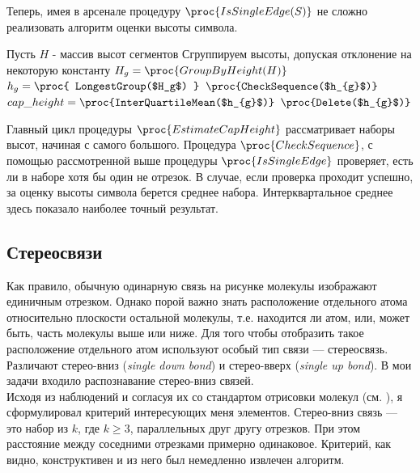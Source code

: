 \noindent
Теперь, имея в арсенале процедуру $\proc{IsSingleEdge(S)}$ не сложно реализовать алгоритм оценки высоты символа.

\begin{codebox}
  \li \Comment Пусть $H$ - массив высот сегментов
  \li
  \li \Comment Сгруппируем высоты, допуская отклонение на некоторую константу
  \li $ H_{g} = \proc{GroupByHeight(H)} $
  \li
  \li \Repeat 
  \li $ h_{g} = \proc{ LongestGroup($H_g$) } $
  \li \If $ \proc{CheckSequence($h_{g}$)} $
  \li \Then $cap\_height = \proc{InterQuartileMean($h_{g}$)} $
  \li \Return \End
  \li $\proc{Delete($h_{g}$)}$
  \li \Until {} \End
\end{codebox}

\noindent
Главный цикл процедуры $\proc{EstimateCapHeight}$ рассматривает наборы высот, начиная с самого большого. Процедура $\proc{CheckSequence}$, с помощью
рассмотренной выше процедуры $\proc{IsSingleEdge}$ проверяет, есть ли в наборе хотя бы один не отрезок. В случае, если проверка проходит успешно,
за оценку высоты символа берется среднее набора. Интерквартальное среднее здесь показало наиболее точный результат. 

\subsection{Стереосвязи}
\label{subsec:stereobonds}

Как правило, обычную одинарную связь на рисунке молекулы изображают единичным отрезком. Однако порой важно знать расположение
отдельного атома относительно плоскости остальной молекулы, т.е. находится ли атом, или, может быть, часть молекулы выше или ниже. 
Для того чтобы отобразить такое расположение отдельного атом используют особый тип связи --- стереосвязь. Различают стерео-вниз 
(\emph{single down bond}) и стерео-вверх (\emph{single up bond}). В мои задачи входило распознавание стерео-вниз связей. \\

\noindent
Исходя из наблюдений и согласуя их со стандартом отрисовки молекул (см. \cite{iupac}), я сформулировал критерий интересующих меня
элементов. Стерео-вниз связь --- это набор из $k$, где $k \ge 3$, параллельных друг другу отрезков. При этом расстояние между
соседними отрезками примерно одинаковое. Критерий, как видно, конструктивен и из него был немедленно извлечен алгоритм.  




